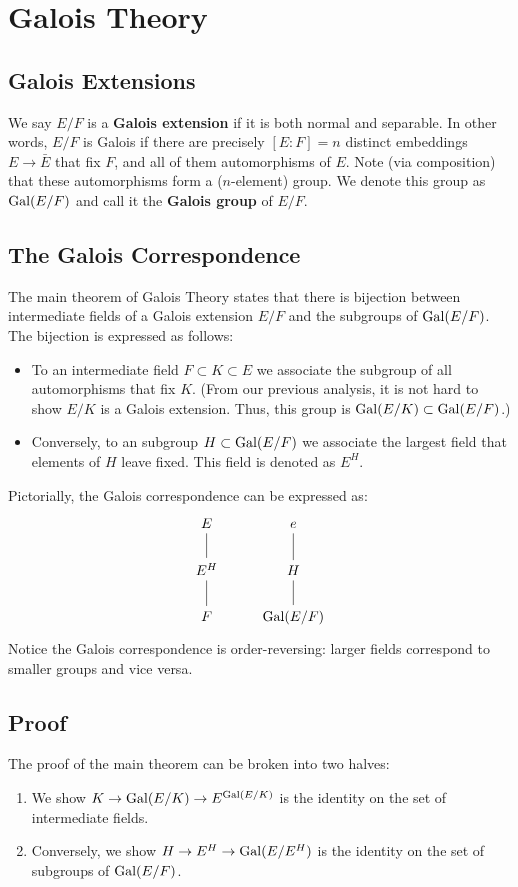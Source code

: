 \section{Galois Theory}

\subsection{Galois Extensions}

We say $E/F$ is a \textbf{Galois extension} if it is both normal and separable. In other words, $E/F$ is Galois if there are precisely $[E : F] = n$ distinct embeddings $E \to \bar{E}$ that fix $F$, and all of them automorphisms of $E$. Note (via composition) that these automorphisms form a ($n$-element) group. We denote this group as $\operatorname{Gal}(E/F)$ and call it the \textbf{Galois group} of $E/F$.

\subsection{The Galois Correspondence}

The main theorem of Galois Theory states that there is bijection between intermediate fields of a Galois extension $E/F$ and the subgroups of $\operatorname{Gal}(E/F)$. The bijection is expressed as follows:
\begin{itemize}
    \item To an intermediate field $F \subset K \subset E$ we associate the subgroup of all automorphisms that fix $K$. (From our previous analysis, it is not hard to show $E/K$ is a Galois extension. Thus, this group is $\operatorname{Gal}(E/K) \subset \operatorname{Gal}(E/F)$.)
    \item Conversely, to an subgroup $H \subset \operatorname{Gal}(E/F)$ we associate the largest field that elements of $H$ leave fixed. This field is denoted as $E^H$.
\end{itemize}

Pictorially, the Galois correspondence can be expressed as:
\[
    \begin{tikzcd}
        E \arrow[d, no head]   & e \arrow[d, no head] \\
        E^H \arrow[d, no head] & H \arrow[d, no head] \\
        F                      & \Gal(E/F)           
    \end{tikzcd}
\]
Notice the Galois correspondence is order-reversing: larger fields correspond to smaller groups and vice versa.

\subsection{Proof}
The proof of the main theorem can be broken into two halves:
\begin{enumerate}
    \item We show $K \rightarrow \operatorname{Gal}(E/K) \rightarrow E^{\operatorname{Gal}(E/K)}$ is the identity on the set of intermediate fields.
    \item Conversely, we show $H \rightarrow E^H \rightarrow \operatorname{Gal}(E/E^H)$ is the identity on the set of subgroups of $\operatorname{Gal}(E/F)$.
\end{enumerate}

